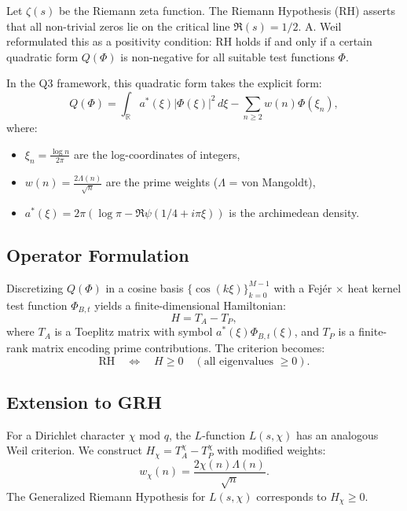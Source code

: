 \documentclass[11pt,a4paper]{article}
\theoremstyle{definition}
\newcommand{\R}{\mathbb{R}}
\begin{document}
Let $\zeta(s)$ be the Riemann zeta function. The Riemann Hypothesis (RH) asserts that all non-trivial zeros lie on the critical line $\Re(s) = 1/2$. A. Weil reformulated this as a positivity condition: RH holds if and only if a certain quadratic form $Q(\Phi)$ is non-negative for all suitable test functions $\Phi$.

In the Q3 framework, this quadratic form takes the explicit form:
\begin{equation}
Q(\Phi) = \int_{\R} a^*(\xi) |\Phi(\xi)|^2 \, d\xi - \sum_{n \geq 2} w(n) \Phi(\xi_n),
\end{equation}
where:
\begin{itemize}
    \item $\xi_n = \frac{\log n}{2\pi}$ are the log-coordinates of integers,
    \item $w(n) = \frac{2\Lambda(n)}{\sqrt{n}}$ are the prime weights ($\Lambda$ = von Mangoldt),
    \item $a^*(\xi) = 2\pi(\log\pi - \Re\psi(1/4 + i\pi\xi))$ is the archimedean density.
\end{itemize}

\subsection{Operator Formulation}

Discretizing $Q(\Phi)$ in a cosine basis $\{\cos(k\xi)\}_{k=0}^{M-1}$ with a Fejér $\times$ heat kernel test function $\Phi_{B,t}$ yields a finite-dimensional Hamiltonian:
\begin{equation}
H = T_A - T_P,
\end{equation}
where $T_A$ is a Toeplitz matrix with symbol $a^*(\xi)\Phi_{B,t}(\xi)$, and $T_P$ is a finite-rank matrix encoding prime contributions. The criterion becomes:
\begin{equation}
\text{RH} \quad \Longleftrightarrow \quad H \geq 0 \quad (\text{all eigenvalues } \geq 0).
\end{equation}

\subsection{Extension to GRH}

For a Dirichlet character $\chi$ mod $q$, the $L$-function $L(s,\chi)$ has an analogous Weil criterion. We construct $H_\chi = T_A^\chi - T_P^\chi$ with modified weights:
\begin{equation}
w_\chi(n) = \frac{2\chi(n)\Lambda(n)}{\sqrt{n}}.
\end{equation}
The Generalized Riemann Hypothesis for $L(s,\chi)$ corresponds to $H_\chi \geq 0$.
\end{document}
